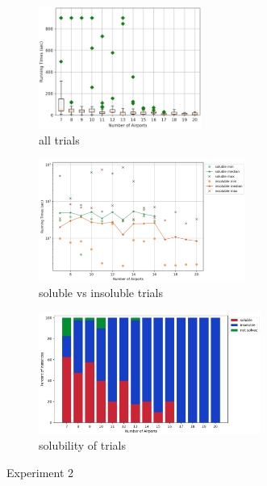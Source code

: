\documentclass{mpaper}
\begin{document}
\begin{figure}[!ht]
    \centering
    \begin{subfigure}[b]{0.30\textwidth}
        \includegraphics[width=\textwidth, height=4cm]{images/experiments/varyn/varyN.png}
        \caption{all trials}
        \label{fig:exp2all}
    \end{subfigure}
    \begin{subfigure}[b]{0.36\textwidth}
        \includegraphics[width=\textwidth, height=4cm]{images/experiments/varyn/satunsat_n.png}
        \caption{soluble vs insoluble trials}
        \label{fig:exp2sat}
    \end{subfigure}
    \begin{subfigure}[b]{0.32\textwidth}
        \includegraphics[width=\textwidth, height=4cm]{images/experiments/varyn/varyNsat.png}
        \caption{solubility of trials}
        \label{fig:varynsat}
    \end{subfigure}
    \caption{Experiment 2}
    \label{experiment2}
\end{figure}
\vspace{-1mm}
\end{document}
